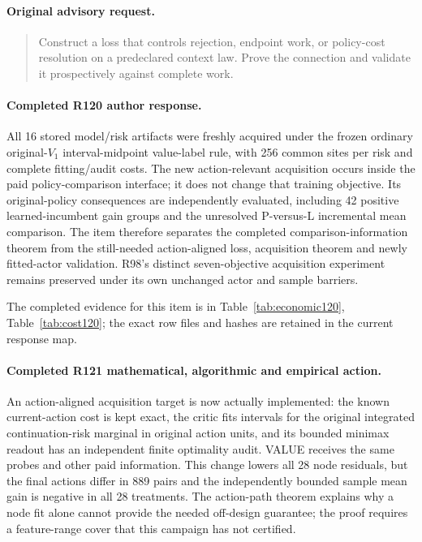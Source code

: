 \paragraph{Original advisory request.}
\begin{quote}
Construct a loss that controls rejection, endpoint work, or policy-cost resolution on a predeclared context law. Prove the connection and validate it prospectively against complete work.
\end{quote}

\paragraph{Completed R120 author response.}
All 16 stored model/risk artifacts were freshly acquired under the frozen ordinary original-$V_1$ interval-midpoint value-label rule, with 256 common sites per risk and complete fitting/audit costs. The new action-relevant acquisition occurs inside the paid policy-comparison interface; it does not change that training objective. Its original-policy consequences are independently evaluated, including 42 positive learned-incumbent gain groups and the unresolved P-versus-L incremental mean comparison. The item therefore separates the completed comparison-information theorem from the still-needed action-aligned loss, acquisition theorem and newly fitted-actor validation. R98's distinct seven-objective acquisition experiment remains preserved under its own unchanged actor and sample barriers.

The completed evidence for this item is in Table~\ref{tab:economic120}, Table~\ref{tab:cost120}; the exact row files and hashes are retained in the current response map.

\paragraph{Completed R121 mathematical, algorithmic and empirical action.}
An action-aligned acquisition target is now actually implemented: the known current-action cost is kept exact, the critic fits intervals for the original integrated continuation-risk marginal in original action units, and its bounded minimax readout has an independent finite optimality audit. VALUE receives the same probes and other paid information. This change lowers all 28 node residuals, but the final actions differ in 889 pairs and the independently bounded sample mean gain is negative in all 28 treatments. The action-path theorem explains why a node fit alone cannot provide the needed off-design guarantee; the proof requires a feature-range cover that this campaign has not certified.


